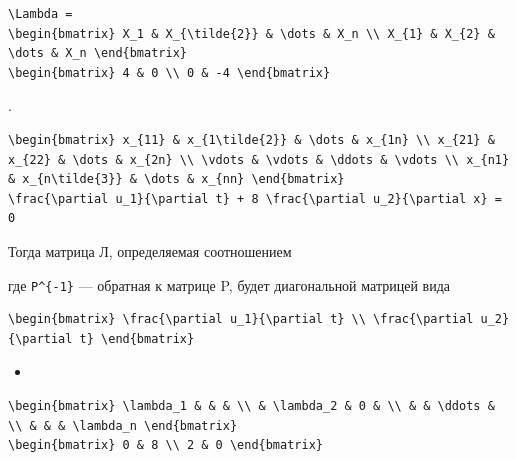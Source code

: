 \documentclass[
  ukrainian,
]{article}
\providecommand{\tightlist}{%
  \setlength{\itemsep}{0pt}\setlength{\parskip}{0pt}}
\begin{document}
\begin{verbatim}
\Lambda =
\begin{bmatrix} X_1 & X_{\tilde{2}} & \dots & X_n \\ X_{1} & X_{2} & \dots & X_n \end{bmatrix}
\begin{bmatrix} 4 & 0 \\ 0 & -4 \end{bmatrix}
\end{verbatim}

.

\begin{verbatim}
\begin{bmatrix} x_{11} & x_{1\tilde{2}} & \dots & x_{1n} \\ x_{21} & x_{22} & \dots & x_{2n} \\ \vdots & \vdots & \ddots & \vdots \\ x_{n1} & x_{n\tilde{3}} & \dots & x_{nn} \end{bmatrix}
\frac{\partial u_1}{\partial t} + 8 \frac{\partial u_2}{\partial x} = 0
\end{verbatim}

Тогда матрица Л, определяемая соотношением

где \texttt{P\^{}\{-1\}} --- обратная к матрице P, будет диагональной
матрицей вида

\begin{verbatim}
\begin{bmatrix} \frac{\partial u_1}{\partial t} \\ \frac{\partial u_2}{\partial t} \end{bmatrix}
\end{verbatim}

\begin{itemize}
\tightlist
\item
\end{itemize}

\begin{verbatim}
\begin{bmatrix} \lambda_1 & & & \\ & \lambda_2 & 0 & \\ & & \ddots & \\ & & & \lambda_n \end{bmatrix}
\begin{bmatrix} 0 & 8 \\ 2 & 0 \end{bmatrix}
\end{verbatim}
\end{document}
